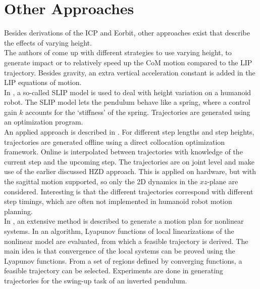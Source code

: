 \section{Other Approaches}
Besides derivations of the \ac{ICP} and \ac{Eorbit}, other approaches exist that describe the effects of varying height. \\
The authors of \cite{gao2017increase} come up with different strategies to use varying height, to generate impact or to relatively speed up the \ac{CoM} motion compared to the \ac{LIP} trajectory. Besides gravity, an extra vertical acceleration constant is added in the \ac{LIP} equations of motion. \\
In \cite{liu2015trajectory}, a so-called \ac{SLIP} model is used to deal with height variation on a humanoid robot. The \ac{SLIP} model lets the pendulum behave like a spring, where a control gain $k$ accounts for the `stiffness' of the spring. Trajectories are generated using an optimization program.\\
An applied approach is described in \cite{nguyen2017dynamic}. For different step lengths and step heights, trajectories are generated offline using a direct collocation optimization framework. Online is interpolated between trajectories with knowledge of the current step and the upcoming step. The trajectories are on joint level and make use of the earlier discussed \ac{HZD} approach. This is applied on hardware, but with the sagittal motion supported, so only the \ac{2D} dynamics in the $xz$-plane are considered. Interesting is that the different trajectories correspond with different step timings, which are often not implemented in humanoid robot motion planning.\\
In \cite{tedrake2010lqr}, an extensive method is described to generate a motion plan for nonlinear systems. In an algorithm, Lyapunov functions of local linearizations of the nonlinear model are evaluated, from which a feasible trajectory is derived. The main idea is that convergence of the local systems can be proved using the Lyapunov functions. From a set of regions defined by converging functions, a feasible trajectory can be selected. Experiments are done in generating trajectories for the swing-up task of an inverted pendulum.\\

